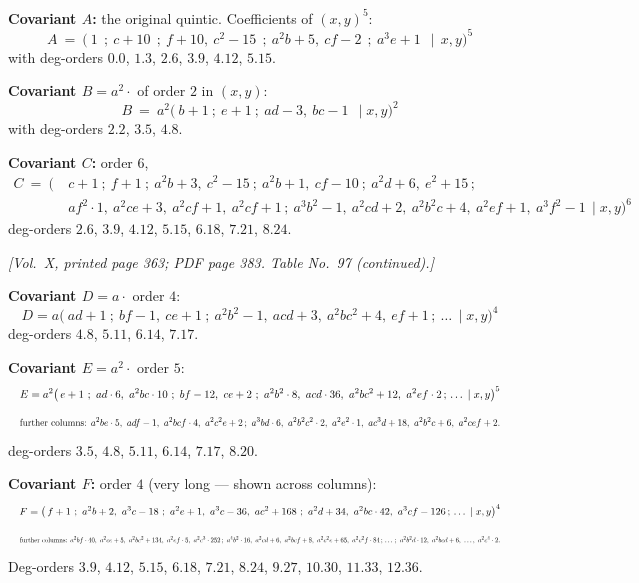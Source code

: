 \documentclass[11pt]{article}
\begin{document}
\medskip

\noindent\textbf{Covariant $A$:} the original quintic. Coefficients of $(x,y)^{5}$:
\[
A\ =\ \bigl(\ 1\ \ ;\ c+10\ \ ;\ f+10,\ c^{2}-15\ \ ;\ a^{2}b+5,\ cf-2\ \ ;\ a^{3}e+1\ \ \mid\,x,y\bigr)^{5}
\]
with deg-orders $0.0$, $1.3$, $2.6$, $3.9$, $4.12$, $5.15$.

\medskip

\noindent\textbf{Covariant $B=a^{2}\!\cdot$} of order $2$ in $(x,y)$:
\[
B\ =\ a^{2}\bigl(\ b+1\ ;\ e+1\ ;\ ad-3,\ bc-1\ \ \mid x,y\bigr)^{2}
\]
with deg-orders $2.2$, $3.5$, $4.8$.

\medskip

\noindent\textbf{Covariant $C$:} order $6$,
\begin{align*}
C\ =\ \bigl(\ &c+1\ ;\ f+1\ ;\ a^{2}b+3,\ c^{2}-15\ ;\ a^{2}b+1,\ cf-10\ ;\ a^{2}d+6,\ e^{2}+15\,;\\
 &af^{2}\cdot 1,\ a^{2}ce+3,\ a^{2}cf+1,\ a^{2}cf+1\,;\ a^{3}b^{2}-1,\ a^{2}cd+2,\ a^{2}b^{2}c+4,\ a^{2}ef+1,\ a^{3}f^{2}-1\,\mid x,y\bigr)^{6}
\end{align*}
deg-orders $2.6$, $3.9$, $4.12$, $5.15$, $6.18$, $7.21$, $8.24$.

\medskip

\noindent\textit{[Vol.~X, printed page 363; PDF page 383. Table No.~97 (continued).]}

\medskip

\noindent\textbf{Covariant $D=a\cdot$} order $4$:
\[
D=a\bigl(\ ad+1\ ;\ bf-1,\ ce+1\ ;\ a^{2}b^{2}-1,\ acd+3,\ a^{2}bc^{2}+4,\ ef+1\,;\ \ldots\,\mid x,y\bigr)^{4}
\]
deg-orders $4.8$, $5.11$, $6.14$, $7.17$.

\medskip

\noindent\textbf{Covariant $E=a^{2}\cdot$} order $5$:
\[
\resizebox{\textwidth}{!}{$\displaystyle
E=a^{2}\bigl(\,e+1\ ;\ ad\cdot 6,\ a^{2}bc\cdot 10\ ;\ bf-12,\ ce+2\ ;\ a^{2}b^{2}\cdot 8,\ acd\cdot 36,\ a^{2}bc^{2}+12,\ a^{2}ef\cdot 2\,;\,\ldots\,\mid x,y\bigr)^{5}
$}
\]
\[
\resizebox{\textwidth}{!}{$\displaystyle
\text{further columns: }a^{2}be\cdot 5,\ adf-1,\ a^{2}bcf\cdot 4,\ a^{2}c^{2}e+2\,;\ a^{3}bd\cdot 6,\ a^{2}b^{2}c^{2}\cdot 2,\ a^{2}e^{2}\cdot 1,\ ac^{3}d+18,\ a^{2}b^{2}c+6,\ a^{2}cef+2.
$}
\]
deg-orders $3.5$, $4.8$, $5.11$, $6.14$, $7.17$, $8.20$.

\medskip

\noindent\textbf{Covariant $F$:} order $4$ (very long --- shown across columns):
\[
\resizebox{\textwidth}{!}{$\displaystyle
F=\bigl(\,f+1\ ;\ a^{2}b+2,\ a^{3}c-18\ ;\ a^{2}e+1,\ a^{3}c-36,\ ac^{2}+168\ ;\ a^{2}d+34,\ a^{2}bc\cdot 42,\ a^{3}cf-126\,;\,\ldots\,\mid x,y\bigr)^{4}
$}
\]
\[
\resizebox{\textwidth}{!}{$\displaystyle
\text{further columns: }a^{2}bf\cdot 40,\ a^{2}ce+5,\ a^{2}bc^{2}+134,\ a^{2}ef\cdot 5,\ a^{2}c^{3}\cdot 252\,;\ a^{4}b^{2}\cdot 16,\ a^{2}cd+6,\ a^{2}bcf+8,\ a^{2}c^{2}e+65,\ a^{2}c^{2}f\cdot 84\,;\,\ldots\,;\ a^{2}b^{2}d\cdot 12,\ a^{2}bcd+6,\ \ldots,\ a^{2}c^{4}\cdot 2.
$}
\]
Deg-orders $3.9$, $4.12$, $5.15$, $6.18$, $7.21$, $8.24$, $9.27$, $10.30$, $11.33$, $12.36$.
\end{document}
